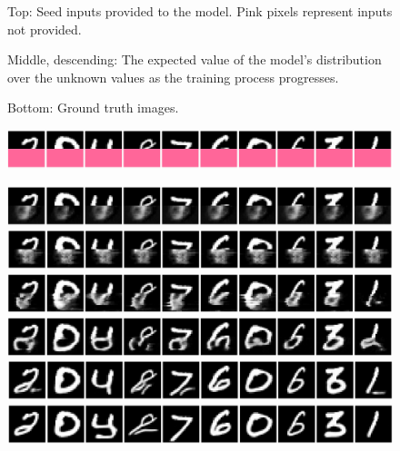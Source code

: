 \begin{figure}
{    Top: Seed inputs provided to the model. Pink pixels represent inputs not provided.

    Middle, descending: The expected value of the model's distribution over the unknown values as the training process progresses.

    Bottom: Ground truth images.}
    \label{fig:training-4col}
\end{figure}

\begin{figure}
    \centering
    \begin{minipage}{0.8\linewidth}
        \includegraphics[width=\linewidth]{figures/mnist-training-seed.png}

        \vspace{0.5cm}

        \includegraphics[width=\linewidth]{figures/mnist-training-0.png}
        \includegraphics[width=\linewidth]{figures/mnist-training-1.png}
        \includegraphics[width=\linewidth]{figures/mnist-training-2.png}
        \includegraphics[width=\linewidth]{figures/mnist-training-3.png}
        \includegraphics[width=\linewidth]{figures/mnist-training-4.png}
        \includegraphics[width=\linewidth]{figures/mnist-training-5.png}


\end{minipage}
\end{figure}
